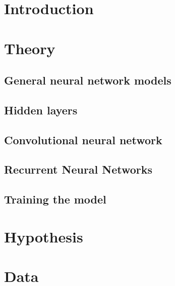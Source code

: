 \documentclass[a4paper]{article}
\begin{document}
\maketitle

\newpage
\tableofcontents
\newpage

\section{Introduction}

\section{Theory}
\subsection{General neural network models} %


\subsection{Hidden layers} %


\subsection{Convolutional neural network} %


\subsection{Recurrent Neural Networks} %


\subsection{Training the model}

\section{Hypothesis} %

\section{Data} %

\end{document}
